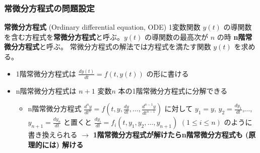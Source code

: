 \documentclass[dvipdfmx,aspectratio=169,20pt]{beamer}
\newcommand{\myfontsetting}[3]{{\fontsize{#1}{#2}\selectfont #3}}
\begin{document}
\date[\todey]{}

\frame{\titlepage}

\begin{frame}
\frametitle{\myfontsetting{24pt}{24pt}{常微分方程式の問題設定}}
\begin{block}{{\bf\small 常微分方程式} {\small (Ordinary differential equation, ODE)}}
\myfontsetting{14pt}{14pt}{
1変数関数 $y(t)$ の導関数を含む方程式を{\bf 常微分方程式}と呼ぶ。$y(t)$ の導関数の最高次が $n$ の時 {\bf n階常微分方程式}と呼ぶ。
常微分方程式の解法では方程式を満たす関数 $y(t)$ を求める。
}
\end{block}

\vspace{-3mm}

\begin{itemize}
    \item \myfontsetting{13pt}{13pt}{1階常微分方程式は $\frac{dy(t)}{dt}=f(t,y(t))$ の形に書ける}
    \item 
    \myfontsetting{13pt}{13pt}{n階常微分方程式は $n+1$ 変数$n$ 本の1階常微分方程式に分解できる}
    \begin{itemize}
        \item \myfontsetting{10pt}{12pt}{n階常微分方程式 $\frac{d^n y}{dt^n} = f\left(t,y,\frac{dy}{dt}, \dots, \frac{d^{n-1} y}{dt^{n-1}}\right)$ に対して
        $y_1=y$, $y_2=\frac{dy_1}{dt}$,$\dots$, $y_{n+1}=\frac{d y_n}{dt}$ と置くと $\frac{dy_i}{dt} = f_i(t, y_1, y_2, \dots, y_{n+1})$ \myfontsetting{8pt}{8pt}{$(1\le i \le n)$} のように書き換えられる $\to$ \myfontsetting{8pt}{8pt}{\bf 1階常微分方程式が解けたらn階常微分方程式も (原理的には) 解ける}}
    \end{itemize}
\end{itemize}
\end{frame}
\end{document}
